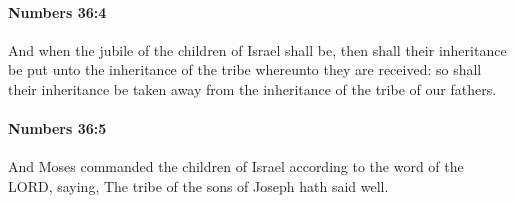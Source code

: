 		\paragraph{Numbers 36:4} %
			\label{NUMBERS-36-4}

			And when the jubile of the children of Israel shall be, then shall their inheritance be put unto the inheritance of the tribe whereunto they are received: so shall their inheritance be taken away from the inheritance of the tribe of our fathers.


		\paragraph{Numbers 36:5} %
			\label{NUMBERS-36-5}

			And Moses commanded the children of Israel according to the word of the LORD, saying, The tribe of the sons of Joseph hath said well.


